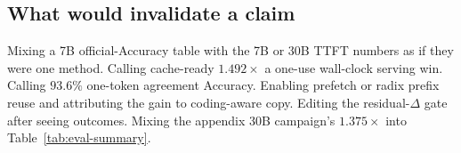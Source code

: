 \subsection{What would invalidate a claim}

Mixing a 7B official-Accuracy table with the 7B or 30B TTFT numbers as
if they were one method. Calling cache-ready $1.492\times$ a one-use
wall-clock serving win. Calling $93.6\%$ one-token agreement
Accuracy. Enabling prefetch or radix prefix reuse and attributing
the gain to coding-aware copy. Editing the residual-$\Delta$
gate after seeing outcomes. Mixing the appendix 30B campaign's
$1.375\times$ into Table~\ref{tab:eval-summary}.
